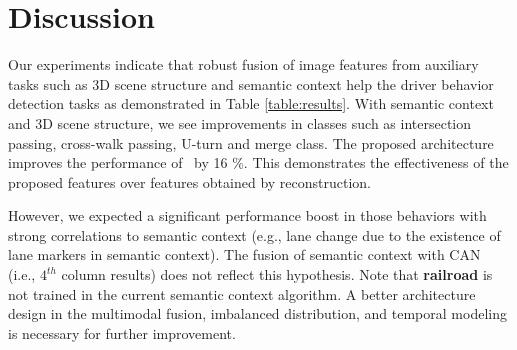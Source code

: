 \documentclass[10pt,twocolumn,letterpaper]{article}
\begin{document}
\section{Discussion}
Our experiments indicate that robust fusion of image features from auxiliary tasks such as 3D scene structure and semantic context help the driver behavior detection tasks as demonstrated in Table \ref{table:results}. With  semantic context and 3D scene structure, we see improvements in classes such as intersection passing, cross-walk passing, U-turn and merge class. The proposed architecture improves the performance of~\cite{santana2016learning} by 16 \%. This demonstrates the effectiveness of the proposed features over features obtained by reconstruction. 

However, we expected a significant performance boost in those behaviors with strong correlations to semantic context (e.g., lane change due to the existence of lane markers in semantic context). The fusion of semantic context with CAN (i.e., $4^{th}$ column results) does not reflect this hypothesis. Note that \textbf{railroad} is not trained in the current semantic context algorithm. A better architecture design in the multimodal fusion, imbalanced distribution, and temporal modeling is necessary for further improvement.







\end{document}
